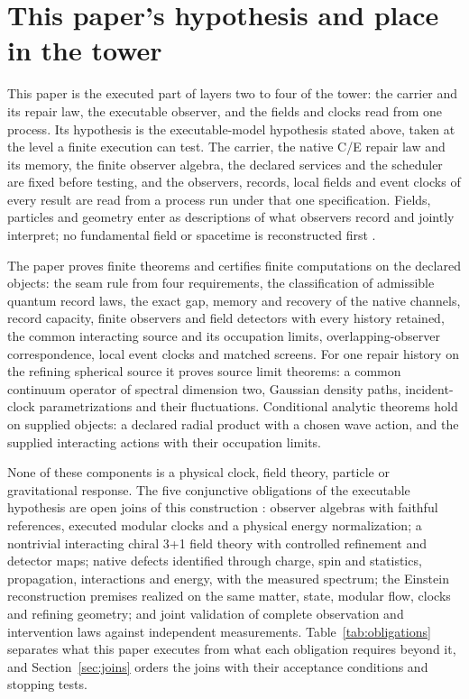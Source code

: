 \documentclass[11pt]{article}
\theoremstyle{definition}
\theoremstyle{remark}
\theoremstyle{plain}
\begin{document}



\section{This paper's hypothesis and place in the tower}
\label{sec:intro}

This paper is the executed part of layers two to four of the tower: the
carrier and its repair law, the executable observer, and the fields and
clocks read from one process. Its hypothesis is the executable-model
hypothesis stated above, taken at the level a finite execution can test.
The carrier, the native C/E repair law and its memory, the finite observer
algebra, the declared services and the scheduler are fixed before testing,
and the observers, records, local fields and event clocks of every result are
read from a process run under that one specification. Fields, particles and
geometry enter as descriptions of what observers record and jointly
interpret; no fundamental field or spacetime is reconstructed first
\cite{mCONSTRUCTION,mINTERP,basis}.

The paper proves finite theorems and certifies finite computations on the
declared objects: the seam rule from four requirements, the classification
of admissible quantum record laws, the exact gap, memory and recovery of the
native channels, record capacity, finite observers and field detectors with
every history retained, the common interacting source and its occupation
limits, overlapping-observer correspondence, local event clocks and matched
screens. For one repair history on the refining spherical source it proves
source limit theorems: a common continuum operator of spectral dimension
two, Gaussian density paths, incident-clock parametrizations and their
fluctuations. Conditional analytic theorems hold on supplied objects: a
declared radial product with a chosen wave action, and the supplied
interacting actions with their occupation limits.

None of these components is a physical clock, field theory, particle or
gravitational response. The five conjunctive obligations of the executable
hypothesis are open joins of this construction \cite{execHypothesis}:
observer algebras with faithful references, executed modular clocks and a
physical energy normalization; a nontrivial interacting chiral 3+1 field
theory with controlled refinement and detector maps; native defects
identified through charge, spin and statistics, propagation, interactions
and energy, with the measured spectrum; the Einstein reconstruction premises
realized on the same matter, state, modular flow, clocks and refining
geometry; and joint validation of complete observation and intervention
laws against independent measurements. Table~\ref{tab:obligations} separates
what this paper executes from what each obligation requires beyond it, and
Section~\ref{sec:joins} orders the joins with their acceptance conditions
and stopping tests.
\end{document}
